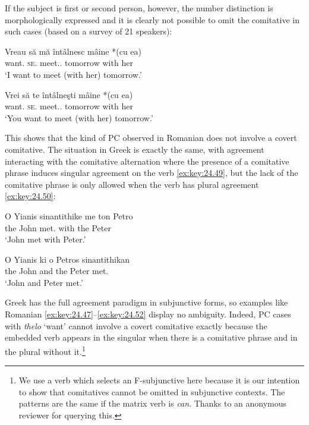 \documentclass[output=paper]{langsci/langscibook}
\begin{document}
If the subject is first or second person, however, the number distinction is
morphologically expressed and it is clearly not possible to omit the comitative
in such cases (based on a survey of 21 speakers):

\ea%
    \label{ex:key:24.49}
    \sn
	\gll Vreau   să   mă     întâlnesc    mâine     *(cu ea)\\
		want.\Fsg{}  \Sbjv{}  \textsc{se}.\Fsg{}  meet.\Sbjv{}.\Fsg{}  tomorrow \hphantom{*(}with her\\
	\glt ‘I want to meet (with her) tomorrow.'
\z

\ea%
    \label{ex:key:24.50}
    \sn
	\gll Vrei   să   te     întâlneşti     mâine     *(cu ea)\\
		want.\Ssg{}  \Sbjv{}  \textsc{se}.\Ssg{}  meet.\Sbjv{}.\Ssg{}  tomorrow \hphantom{*(}with her\\
	\glt ‘You want to meet (with her) tomorrow.'
\z

This shows that the kind of \gls{PC} observed in
Romanian does not involve a covert comitative. The situation in Greek is
exactly the same, with agreement interacting with the comitative alternation
where the presence of a comitative phrase induces singular agreement on the
verb \eqref{ex:key:24.49}, but the lack of the comitative phrase is only allowed when the verb
has plural agreement \eqref{ex:key:24.50}:

\ea%
    \label{ex:key:24.51}
\z

\ea%
    \label{ex:key:24.52}
    \sn
	\gll O Yianis sinantithike me ton Petro\\
		the John met.\Tsg{}    with the Peter\\
	\glt ‘John met with Peter.’
\z

\ea%
    \label{ex:key:24.53}
    \sn
	\gll O Yianis ki o Petros sinantithikan\\
		the John and the Peter met.\Tpl{} \\
	\glt ‘John and Peter met.’
\z

Greek has the full agreement paradigm in subjunctive forms, so examples like
Romanian \eqref{ex:key:24.47}--\eqref{ex:key:24.52} display no ambiguity.
Indeed, \gls{PC} cases with \emph{thelo} ‘want’
cannot involve a covert comitative exactly because the embedded verb appears in
the singular when there is a comitative phrase and in the plural without
it.\footnote{We use a verb which selects an F-subjunctive here because it is
    our intention to show that comitatives cannot be omitted in subjunctive
    contexts. The patterns are the same if the matrix verb is \emph{can}. Thanks to an
anonymous reviewer for querying this.}
\end{document}
